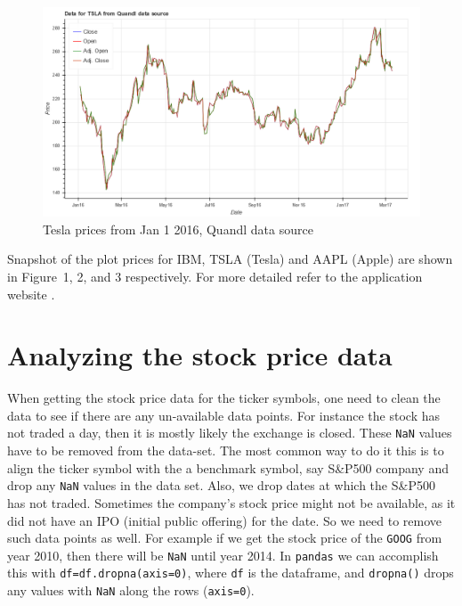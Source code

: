 \documentclass[12pt]{article}
\begin{document}
\begin{figure}[!htbp]
\label{fig:tsla}
\begin{center}
\includegraphics[height=0.5\textheight,width=\textwidth]{price_plot_TSLA.png}
\caption{Tesla prices from Jan 1 2016, Quandl data source}
\end{center}
\end{figure}


Snapshot of the plot prices for IBM, TSLA (Tesla) and AAPL (Apple) are shown in Figure~1, 2, and 3 respectively. For more detailed refer to the application website \href{http://quantfy.herokuapp.com}{\color{blue}{\bf QuantFy}} \cite{qfy}.


\section{Analyzing the stock price data}
\label{sec:anal}

When getting the stock price data for the ticker symbols, one need to clean the data to see if there are any un-available data points. For instance the stock has not traded a day, then it is mostly likely the exchange is closed. These \texttt{NaN} values have to be removed from the data-set. The most common way to do it this is to align the ticker symbol with the a benchmark symbol, say S\&P500 company and drop any \texttt{NaN} values in the data set. Also, we drop dates at which the S\&P500 has not traded. Sometimes the company's stock price might not be available, as it did not have an IPO (initial public offering) for the date. So we need to remove such data points as well. For example if we get the stock price of the \texttt{GOOG} from year 2010, then there will be \texttt{NaN} until year 2014. In \texttt{pandas} we can accomplish this with \texttt{df=df.dropna(axis=0)}, where \texttt{df} is the dataframe, and \texttt{dropna()} drops any values with \texttt{NaN} along the rows (\texttt{axis=0}).
\end{document}
